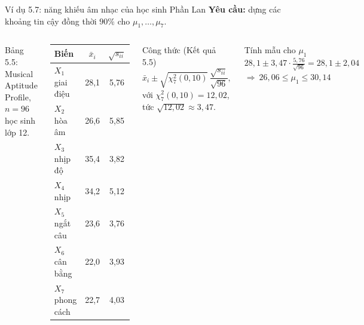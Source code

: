 \begin{frame}{Ví dụ 5.7: năng khiếu âm nhạc của học sinh Phần Lan}
  \textbf{Yêu cầu:} dựng các khoảng tin cậy đồng thời \(90\%\) cho \(\mu_1,\dots,\mu_7\).
  \vspace{0.1cm}
  \begin{columns}[T]
    {\small Bảng 5.5: Musical Aptitude Profile, \(n=96\) học sinh lớp 12.}
    \vspace{0.05cm}
    \begin{center}
      \small
      \begin{tabular}{@{}lcc@{}}
        \toprule
        Biến & \(\bar{x}_i\) & \(\sqrt{s_{ii}}\) \\
        \midrule
        \(X_1\) giai điệu   & 28{,}1 & 5{,}76 \\
        \(X_2\) hòa âm      & 26{,}6 & 5{,}85 \\
        \(X_3\) nhịp độ     & 35{,}4 & 3{,}82 \\
        \(X_4\) nhịp        & 34{,}2 & 5{,}12 \\
        \(X_5\) ngắt câu    & 23{,}6 & 3{,}76 \\
        \(X_6\) cân bằng    & 22{,}0 & 3{,}93 \\
        \(X_7\) phong cách  & 22{,}7 & 4{,}03 \\
        \bottomrule
      \end{tabular}
    \end{center}
    \begin{block}{Công thức (Kết quả 5.5)}
      \[
        \bar{x}_i \pm \sqrt{\chi^2_7(0{,}10)}\,\frac{\sqrt{s_{ii}}}{\sqrt{96}},
      \]
      với \(\chi^2_7(0{,}10)=12{,}02\), tức \(\sqrt{12{,}02}\approx 3{,}47\).
    \end{block}
    \begin{exampleblock}{Tính mẫu cho \(\mu_1\)}
      \(28{,}1 \pm 3{,}47\cdot\frac{5{,}76}{\sqrt{96}} = 28{,}1 \pm 2{,}04\)\\
      \(\Rightarrow\ 26{,}06 \le \mu_1 \le 30{,}14\)
    \end{exampleblock}
  \end{columns}
\end{frame}

